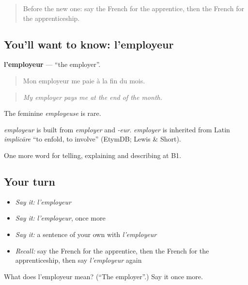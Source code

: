 \label{lesson:FR-C357-employeur}



\begin{quote}
Before the new one: say the French for the apprentice, then the French for the apprenticeship.
\end{quote}

\subsection*{You'll want to know: l'employeur}
\textbf{l'employeur} — \textquotedblleft{}the employer\textquotedblright{}.

\begin{quote}
Mon employeur me paie à la fin du mois.
\end{quote}

\begin{quote}
\emph{My employer pays me at the end of the month.}
\end{quote}

The feminine \emph{employeuse} is rare.

\begin{cousinweb}
\emph{employeur} is built from \emph{employer} and \emph{-eur}. \emph{employer} is inherited from Latin \emph{implicāre} \textquotedblleft{}to enfold, to involve\textquotedblright{} (EtymDB; Lewis \& Short).
\end{cousinweb}

\begin{grammarlens}[title={What you've built}]
One more word for telling, explaining and describing at B1.
\end{grammarlens}

\subsection*{Your turn}
\begin{itemize}
\raggedright
  \item \emph{Say it:} \emph{l'employeur}
  \item \emph{Say it:} \emph{l'employeur}, once more
  \item \emph{Say it:} a sentence of your own with \emph{l'employeur}
  \item \emph{Recall:} say the French for the apprentice, then the French for the apprenticeship, then say \emph{l'employeur} again
\end{itemize}

\begin{tcolorbox}[breakable,colback=teal!4,colframe=teal!35!black,title={Before you move on}]
What does l'employeur mean? (\textquotedblleft{}The employer\textquotedblright{}.) Say it once more.
\end{tcolorbox}
